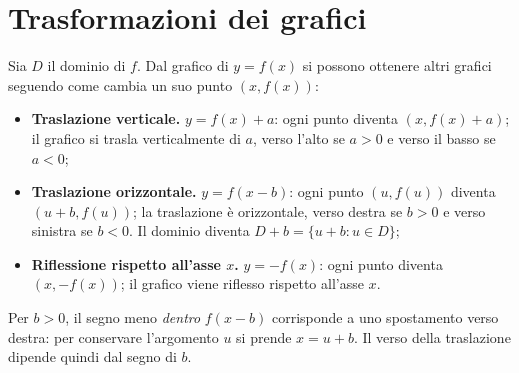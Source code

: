 \begin{schema}
\hspace{.6cm}
\end{schema}

\section{Trasformazioni dei grafici}

Sia $D$ il dominio di $f$. Dal grafico di $y=f(x)$ si possono ottenere altri grafici seguendo come cambia un suo punto $(x,f(x))$:
\begin{itemize}
  \item \textbf{Traslazione verticale.} $y=f(x)+a$: ogni punto diventa $(x,f(x)+a)$; il grafico si trasla verticalmente di $a$, verso l'alto se $a>0$ e verso il basso se $a<0$;
  \item \textbf{Traslazione orizzontale.} $y=f(x-b)$: ogni punto $(u,f(u))$ diventa $(u+b,f(u))$; la traslazione è orizzontale, verso destra se $b>0$ e verso sinistra se $b<0$. Il dominio diventa $D+b=\{u+b:u\in D\}$;
  \item \textbf{Riflessione rispetto all’asse $x$.} $y=-f(x)$: ogni punto diventa $(x,-f(x))$; il grafico viene riflesso rispetto all'asse $x$.
\end{itemize}
Per $b>0$, il segno meno \emph{dentro} $f(x-b)$ corrisponde a uno spostamento verso destra: per conservare l'argomento $u$ si prende $x=u+b$. Il verso della traslazione dipende quindi dal segno di $b$.

